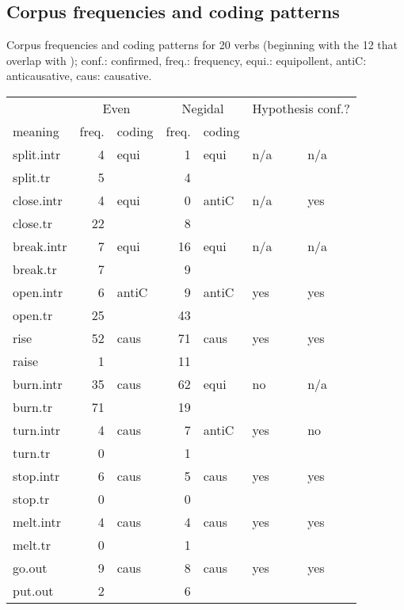 \documentclass[output=paper,colorlinks,citecolor=brown]{langscibook}
\begin{document}
\begin{paperappendix}

\section{Corpus frequencies and coding patterns}\label{Appendix4}

Corpus frequencies and coding patterns for 20 verbs (beginning with the 12 that overlap with \citealt{Haspelmathetal2014}); conf.: confirmed, freq.: frequency, equi.: equipollent, antiC: anticausative, caus: causative.

\begin{table}
\begin{tabular}{ l rl rl ll }
  \lsptoprule
	& \multicolumn{2}{c}{Even} &	\multicolumn{2}{c}{Negidal} & \multicolumn{2}{c}{Hypothesis conf.?}\\\cmidrule(lr){2-3}\cmidrule(lr){4-5}\cmidrule(lr){6-7}
meaning &	freq. &	coding &	freq. &	coding &	\ili{Even} &	\ili{Negidal}\\
  \midrule
split.intr &	4 &	equi &	1 &	equi &	n/a &	n/a\\
split.tr &	5 &&		4 &			&&\\
\midrule
close.intr &	4 &	equi &	0 &	antiC &	n/a  &	yes\\
close.tr &	22 &&		8 &			&&\\
\midrule
break.intr &	7 &	equi &	16 &	equi &	n/a &	n/a\\
break.tr &	7 &&	9 &			&&\\
\midrule
open.intr &	6 &	antiC &	9 &	antiC &	yes &	yes\\
open.tr &	25 &&		43	 &		&&\\
\midrule
rise &	52 &	caus &	71 &	caus &	yes &	yes\\
raise &	1 &&	11 &			&&\\
\midrule
burn.intr &	35 &	caus &	62 &	equi &	no &	n/a\\
burn.tr &	71 &&		19 &			&&\\
\midrule
turn.intr &	4 &	caus &	7 &	antiC &	yes &	no\\
turn.tr &	0 &&		1 &			&&\\
\midrule
stop.intr &	6 &	caus &	5 &	caus &	yes &	yes\\
stop.tr &	0 &&		0 &			&&\\
\midrule
melt.intr &	4 &	caus &	4 &	caus &	yes &	yes\\
melt.tr &	0 &&		1 &			&&\\
\midrule
go.out &	9 &	caus &	8 &	caus &	yes &	yes\\
put.out &	2 &&		6 &			&&\\

\end{tabular}
\end{table}
\end{paperappendix}
\end{document}
